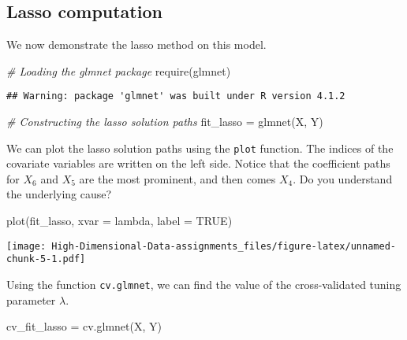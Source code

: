 \documentclass[
]{book}
\newenvironment{Shaded}{\begin{snugshade}}{\end{snugshade}}
\newcommand{\AttributeTok}[1]{\textcolor[rgb]{0.77,0.63,0.00}{#1}}
\newcommand{\CommentTok}[1]{\textcolor[rgb]{0.56,0.35,0.01}{\textit{#1}}}
\newcommand{\ConstantTok}[1]{\textcolor[rgb]{0.00,0.00,0.00}{#1}}
\newcommand{\FunctionTok}[1]{\textcolor[rgb]{0.00,0.00,0.00}{#1}}
\newcommand{\NormalTok}[1]{#1}
\newcommand{\OtherTok}[1]{\textcolor[rgb]{0.56,0.35,0.01}{#1}}
\newcommand{\StringTok}[1]{\textcolor[rgb]{0.31,0.60,0.02}{#1}}
\begin{document}
\hypertarget{lasso-computation}{%
\subsection{Lasso computation}\label{lasso-computation}}

We now demonstrate the lasso method on this model.

\begin{Shaded}
\begin{Highlighting}[]
\CommentTok{\# Loading the \textquotesingle{}glmnet\textquotesingle{} package}
\FunctionTok{require}\NormalTok{(glmnet)}
\end{Highlighting}
\end{Shaded}

\begin{verbatim}
## Warning: package 'glmnet' was built under R version 4.1.2
\end{verbatim}

\begin{Shaded}
\begin{Highlighting}[]
\CommentTok{\# Constructing the lasso solution paths}
\NormalTok{fit\_lasso }\OtherTok{=} \FunctionTok{glmnet}\NormalTok{(X, Y)}
\end{Highlighting}
\end{Shaded}

We can plot the lasso solution paths using the \texttt{plot} function. The indices of the covariate variables are written on the left side. Notice that the coefficient paths for \(X_6\) and \(X_5\) are the most prominent, and then comes \(X_4\). Do you understand the underlying cause?

\begin{Shaded}
\begin{Highlighting}[]
\FunctionTok{plot}\NormalTok{(fit\_lasso, }\AttributeTok{xvar =} \StringTok{\textquotesingle{}lambda\textquotesingle{}}\NormalTok{, }\AttributeTok{label =} \ConstantTok{TRUE}\NormalTok{)}
\end{Highlighting}
\end{Shaded}

\texttt{[image: High-Dimensional-Data-assignments\_files/figure-latex/unnamed-chunk-5-1.pdf]}

Using the function \texttt{cv.glmnet}, we can find the value of the cross-validated tuning parameter \(\lambda\).

\begin{Shaded}
\begin{Highlighting}[]
\NormalTok{cv\_fit\_lasso }\OtherTok{=} \FunctionTok{cv.glmnet}\NormalTok{(X, Y)}
\end{Highlighting}
\end{Shaded}
\end{document}
